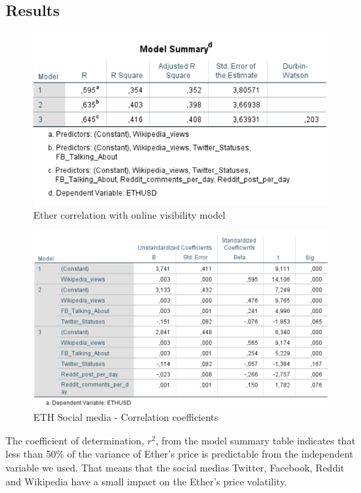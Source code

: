 \documentclass[11pt]{report}
\begin{document}
\subsection*{Results}
\begin{figure}[!h]
\centering
\includegraphics[scale=1]{Chap5/Modelsummary}
\centering
\caption{Ether correlation with online visibility model}
\label{Socialresults}
\end{figure}
\begin{figure}[!h]
\centering
\includegraphics[scale=1]{Chap5/Coefficients}
\caption{ETH Social media - Correlation coefficients}
\end{figure}
\clearpage

The coefficient of determination, $r^2$, from the model summary table indicates that less than 50\% of the variance of Ether’s price is predictable from the independent variable we used. That means that the social medias Twitter, Facebook, Reddit and Wikipedia have a small impact on the Ether’s price volatility.\newline
\end{document}
